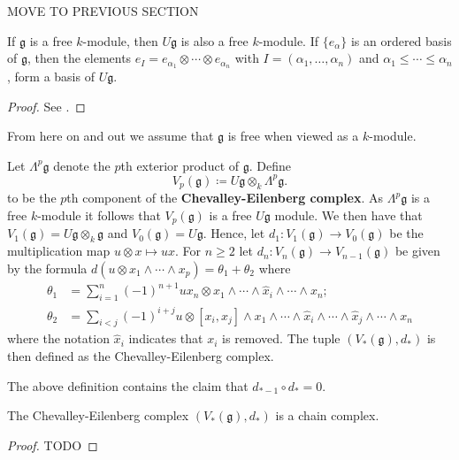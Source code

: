 MOVE TO PREVIOUS SECTION
\begin{theorem}
  If $ \mathfrak{g} $ is a free $ k $-module, then $ U\mathfrak{g} $ is also a free $ k $-module. If $ \{e_\alpha\} $ is an ordered basis of $ \mathfrak{g} $, then the elements $ e_I=e_{\alpha_1} \otimes \cdots \otimes e_{\alpha_n} $ with $ I=(\alpha_1, \ldots, \alpha_n) $ and $ \alpha_1 \leq \cdots \leq \alpha_n $, form a basis of $ U\mathfrak{g} $.
\end{theorem}
\begin{proof}
  See \cite[XIII.3]{CartanEilenberg1956}.
\end{proof}

From here on and out we assume that $ \mathfrak{g} $ is free when viewed as a $ k $-module.
\begin{definition}
  Let $ \Lambda^p\mathfrak{g} $ denote the $ p $th exterior product of $ \mathfrak{g} $. Define
  \begin{equation}
    V_p(\mathfrak{g}) \coloneqq U\mathfrak{g} \otimes_k \Lambda^p\mathfrak{g}.
    \label{eq:cheval}
  \end{equation}
  to be the $ p $th component of the \textbf{Chevalley-Eilenberg complex}. As $ \Lambda^p\mathfrak{g} $ is a free $ k $-module it follows that $ V_p(\mathfrak{g}) $ is a free $ U\mathfrak{g} $ module. We then have that $ V_1(\mathfrak{g}) = U\mathfrak{g} \otimes_k \mathfrak{g} $ and $ V_0(\mathfrak{g}) = U\mathfrak{g} $. Hence, let $ d_1: V_1(\mathfrak{g}) \to V_0(\mathfrak{g}) $ be the multiplication map $ u \otimes x \mapsto ux $. For $ n \geq 2 $ let $ d_n: V_n(\mathfrak{g}) \to V_{n-1}(\mathfrak{g}) $ be given by the formula $ d(u \otimes x_1 \wedge \cdots \wedge x_p) = \theta_1 + \theta_2 $ where
  \begin{align*}
    \theta_1 &= \sum_{i = 1}^{n} (-1)^{n+1}ux_n \otimes x_1 \wedge \cdots \wedge \hat{x}_i \wedge \cdots \wedge x_n;\\
    \theta_2 &= \sum_{i <j} (-1)^{i + j}u \otimes [x_i,x_j]\wedge x_1\wedge \cdots \wedge \hat{x}_i\wedge \cdots \wedge \hat{x}_j \wedge \cdots \wedge x_n
  \end{align*}
  where the notation $ \hat{x}_i $ indicates that $ x_i $ is removed. The tuple $ (V_*(\mathfrak{g}), d_*) $ is then defined as the Chevalley-Eilenberg complex.
\end{definition}

The above definition contains the claim that $ d_{*-1}\circ d_* = 0 $.
\begin{claim}
  The Chevalley-Eilenberg complex $ (V_*(\mathfrak{g}), d_*) $ is a chain complex.
\end{claim}
\begin{proof}
  TODO
\end{proof}

